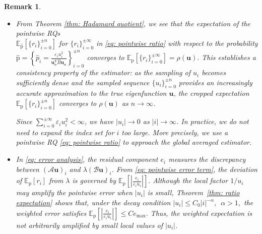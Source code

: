 \documentclass[11pt]{article}
\def\u{\mathbf{u}}
\newtheorem{remark}[thm]{Remark}
\numberwithin{equation}{section}
\begin{document}
\begin{remark}

\begin{itemize}
    \item[(i)] From Theorem \ref{thm: Hadamard quotient}, we see that the expectation of the pointwise RQs\\ $\mathbb{E}_{\widehat{\mathrm{p}}}\left[\{r_i\}_{i=0}^{\pm n}\right]$ for $\{r_i\}_{i=0}^{\pm \infty}$ in \eqref{eq: pointwise ratio} with respect to the probability $\widehat{\mathrm{p}} = \left\{\widehat{p}_i = \frac{\varepsilon_i u_i^2}{\u_{\mathbf{o}}^\mathsf{T} \widehat{B}\u_{\mathbf{o}}}\right\}_{i=0}^{\pm n}$ converges to $\mathbb{E}_{\mathrm{p}}\left[\{r_i\}_{i=0}^{\pm \infty}\right] = \rho(\boldsymbol{u}).$ This establishes a consistency property of the estimator: as the sampling of $u_i$ becomes sufficiently dense and the sampled sequence $\{u_i\}_{i=0}^{\pm n}$ provides an increasingly accurate approximation to the true eigenfunction $\boldsymbol{u}$, the cropped expectation $\mathbb{E}_{\mathrm{p}}\!\left[\{r_i\}_{i=0}^{\pm n}\right]$ converges to $\rho(\boldsymbol{u})$ as $n\to\infty$.

    Since $\sum_{i=0}^{\pm \infty}\varepsilon_i u_i^2<\infty$, we have $|u_i|\to0$ as $|i|\to\infty$. In practice, we do not need to expand the index set for $i$ too large. More precisely, we use a pointwise RQ \eqref{eq: pointwise ratio} to approach the global averaged estimator.

    \item [(ii)]

    In \eqref{eq: error analysis}, the residual component $e_i$ measures the discrepancy between $(\mathcal{A}\boldsymbol{u})_i$ and  $\lambda(\mathcal{B}\boldsymbol{u})_i$. From  \eqref{eq: pointwise error term}, the deviation of $\mathbb{E}_{\mathrm p}[r_i]$ from $\lambda$ is governed by $\mathbb{E}_{\mathrm p} \left[ \left|\frac{e_i}{\varepsilon_i u_i} \right| \right].$
    Although the local factor $1/u_i$ may amplify the pointwise error when $|u_i|$ is small, Theorem~\ref{thm: ratio expectation} shows that, under the decay condition
    $ |u_i|\le C_0 |i|^{-\alpha},
    \,\,\, \alpha>1, $
    the weighted error satisfies $
    \mathbb{E}_{\mathrm p} \left[ \left|
    \frac{e_i}{\varepsilon_i u_i}
    \right| \right] \le C e_{\max}.
    $
    Thus, the weighted expectation is not arbitrarily amplified by small local
    values of $|u_i|$.


\end{itemize}
\end{remark}
\end{document}
